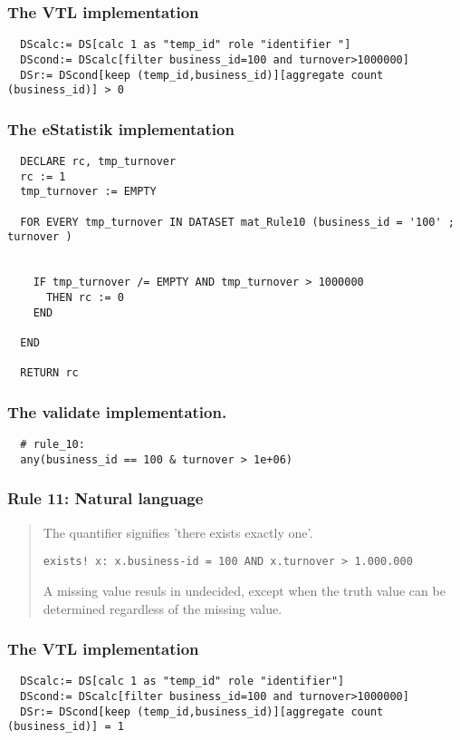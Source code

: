 \subsubsection*{The VTL implementation}
\begin{verbatim}
  DScalc:= DS[calc 1 as "temp_id" role "identifier "]
  DScond:= DScalc[filter business_id=100 and turnover>1000000]
  DSr:= DScond[keep (temp_id,business_id)][aggregate count (business_id)] > 0
\end{verbatim}
\subsubsection*{The eStatistik implementation}
\begin{verbatim}
  DECLARE rc, tmp_turnover 
  rc := 1
  tmp_turnover := EMPTY

  FOR EVERY tmp_turnover IN DATASET mat_Rule10 (business_id = '100' ; turnover )


    IF tmp_turnover /= EMPTY AND tmp_turnover > 1000000
      THEN rc := 0
    END

  END

  RETURN rc
\end{verbatim}
\subsubsection*{The validate implementation.}
\begin{verbatim}
  # rule_10:
  any(business_id == 100 & turnover > 1e+06)
\end{verbatim}


\newpage

\subsubsection*{  Rule 11: Natural language}
\begin{quote}


The  quantifier signifies 'there exists exactly one'.


\begin{verbatim}
exists! x: x.business-id = 100 AND x.turnover > 1.000.000
\end{verbatim}

A missing value resuls in undecided, except when the truth value can be determined regardless of the missing value.



\end{quote}
\subsubsection*{The VTL implementation}
\begin{verbatim}
  DScalc:= DS[calc 1 as "temp_id" role "identifier"]
  DScond:= DScalc[filter business_id=100 and turnover>1000000]
  DSr:= DScond[keep (temp_id,business_id)][aggregate count (business_id)] = 1
\end{verbatim}
